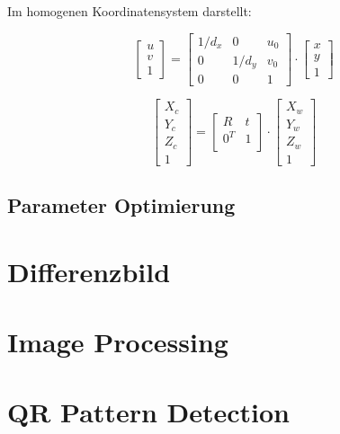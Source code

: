 Im homogenen Koordinatensystem darstellt:

\begin{equation}
   \begin{bmatrix}
	u \\  
	v \\
	1
	\end{bmatrix} = \begin{bmatrix}
	1/d_x & 0 & u_0	\\
	0	  & 1/d_y & v_0	\\
	0     & 0 & 1	
	\end{bmatrix} \cdot \begin{bmatrix}
	x \\  
	y \\
	1
	\end{bmatrix}
\end{equation}


\begin{equation}
   \begin{bmatrix}
	X_c \\  
	Y_c \\
	Z_c \\
	1
	\end{bmatrix} = \begin{bmatrix}
	R & t	\\
	0^T	& 1 \\
	\end{bmatrix} \cdot \begin{bmatrix}
	X_w \\  
	Y_w \\
	Z_w \\
	1
	\end{bmatrix}
\end{equation}


\subsection{Parameter Optimierung}

\section{Differenzbild}


\section{Image Processing} 


\section{QR Pattern Detection} 


